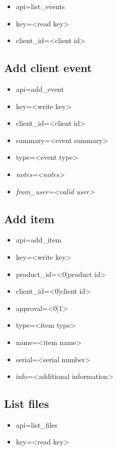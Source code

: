 \documentclass[11pt]{article}
\begin{document}
\begin{itemize}
\item api=list\_events
\item key=<read key>
\item client\_id=<client id>
\end{itemize}

\subsection{Add client event}

\begin{itemize}
\item api=add\_event
\item key=<write key>
\item client\_id=<client id>
\item summary=<event summary>
\item type=<event type>
\item \textit{notes=<notes>}
\item \textit{from\_user=<valid user>}
\end{itemize}

\subsection{Add item}

\begin{itemize}
\item api=add\_item
\item key=<write key>
\item product\_id=<0|product id>
\item client\_id=<0|client id>
\item approval=<0|1>
\item type=<item type>
\item name=<item name>
\item serial=<serial number>
\item info=<additional information>
\end{itemize}

\subsection{List files}

\begin{itemize}
\item api=list\_files
\item key=<read key>
\end{itemize}
\end{document}
